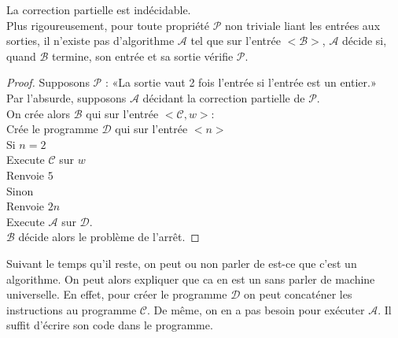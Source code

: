 \begin{theorem}
	La correction partielle est indécidable.\\
	Plus rigoureusement, pour toute propriété $\mathcal P$ non triviale liant les entrées aux sorties, il n'existe pas d'algorithme $\mathcal A$ tel que sur l'entrée $<\mathcal B>$, $\mathcal A$ décide si, quand $\mathcal B$ termine, son entrée et sa sortie vérifie $\mathcal P$.
\end{theorem}

\begin{proof}
	Supposons $\mathcal P$ : «La sortie vaut 2 fois l'entrée si l'entrée est un entier.»\\
	Par l'absurde, supposons $\mathcal A$ décidant la correction partielle de $\mathcal P$.\\
	On crée alors $\mathcal B$ qui sur l'entrée $<\mathcal C, w>$:\\
	\indent Crée le programme $\mathcal D$ qui sur l'entrée $<n>$\\
	\indent \indent Si $n = 2$\\
	\indent \indent \indent Execute $\mathcal C$ sur $w$\\
	\indent \indent \indent Renvoie $5$\\
	\indent \indent Sinon\\
	\indent \indent \indent Renvoie $2n$\\
	\indent Execute $\mathcal A$ sur $\mathcal D$.\\
	
	$\mathcal B$ décide alors le problème de l'arrêt.
\end{proof}

\begin{com}
	Suivant le temps qu'il reste, on peut ou non parler de est-ce que c'est un algorithme. On peut alors expliquer que ca en est un sans parler de machine universelle. En effet, pour créer le programme $\mathcal D$ on peut concaténer les instructions au programme $\mathcal C$. De même, on en a pas besoin pour exécuter $\mathcal A$. Il suffit d'écrire son code dans le programme.
\end{com}
